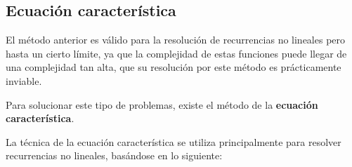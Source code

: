 \documentclass[10pt,a4paper,spanish]{report}
\theoremstyle{definition}
\theoremstyle{remark}
\begin{document}
\subsection{\textcolor{YellowOrange}Ecuación característica}

El método anterior es válido para la resolución de recurrencias no lineales pero hasta un cierto límite, ya que la complejidad de estas funciones puede llegar de una complejidad tan alta, que su resolución por este método es prácticamente inviable.

Para solucionar este tipo de problemas, existe el método de la \textbf{\textcolor{YellowOrange}{ecuación característica}}.

La técnica de la ecuación característica se utiliza principalmente para resolver recurrencias no lineales, basándose en lo siguiente:
\end{document}
